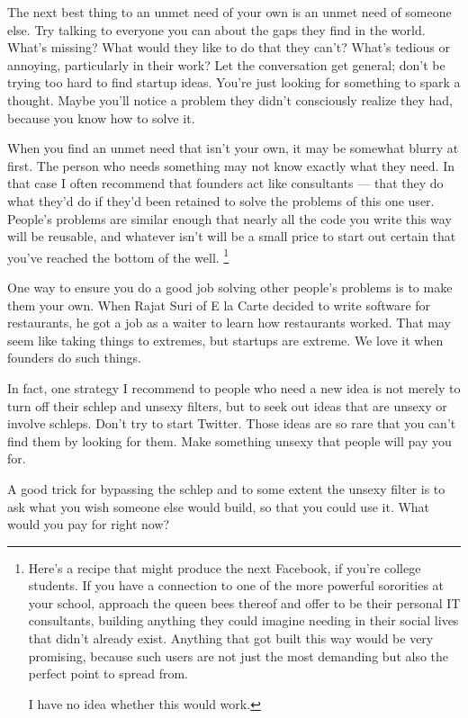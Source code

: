 \documentclass[12pt]{book}
\begin{document}
The next best thing to an unmet need of your own is an unmet need of
someone else. Try talking to everyone you can about the gaps they find
in the world. What's missing? What would they like to do that they
can't? What's tedious or annoying, particularly in their work? Let the
conversation get general; don't be trying too hard to find startup
ideas. You're just looking for something to spark a thought. Maybe
you'll notice a problem they didn't consciously realize they had,
because you know how to solve it.

When you find an unmet need that isn't your own, it may be somewhat
blurry at first. The person who needs something may not know exactly
what they need. In that case I often recommend that founders act like
consultants --- that they do what they'd do if they'd been retained to
solve the problems of this one user. People's problems are similar
enough that nearly all the code you write this way will be reusable, and
whatever isn't will be a small price to start out certain that you've
reached the bottom of the well. \footnote{Here's a recipe that might produce the next Facebook, if you're
college students. If you have a connection to one of the more powerful
sororities at your school, approach the queen bees thereof and offer to
be their personal IT consultants, building anything they could imagine
needing in their social lives that didn't already exist. Anything that
got built this way would be very promising, because such users are not
just the most demanding but also the perfect point to spread from.

I have no idea whether this would work.}

One way to ensure you do a good job solving other people's problems is
to make them your own. When Rajat Suri of E la Carte decided to write
software for restaurants, he got a job as a waiter to learn how
restaurants worked. That may seem like taking things to extremes, but
startups are extreme. We love it when founders do such things.

In fact, one strategy I recommend to people who need a new idea is not
merely to turn off their schlep and unsexy filters, but to seek out
ideas that are unsexy or involve schleps. Don't try to start Twitter.
Those ideas are so rare that you can't find them by looking for them.
Make something unsexy that people will pay you for.

A good trick for bypassing the schlep and to some extent the unsexy
filter is to ask what you wish someone else would build, so that you
could use it. What would you pay for right now?
\end{document}
